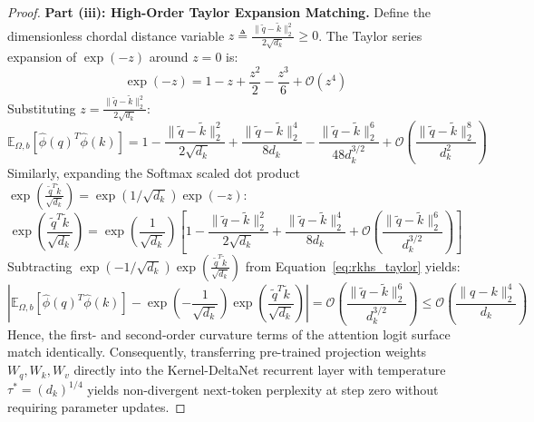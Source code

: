 \begin{proof}
\bigskip
\noindent
\textbf{Part (iii): High-Order Taylor Expansion Matching.}
Define the dimensionless chordal distance variable $z \triangleq \frac{\|\tilde{q} - \tilde{k}\|_2^2}{2\sqrt{d_k}} \ge 0$. The Taylor series expansion of $\exp(-z)$ around $z = 0$ is:
\begin{equation}
\exp(-z) = 1 - z + \frac{z^2}{2} - \frac{z^3}{6} + \mathcal{O}(z^4)
\end{equation}
Substituting $z = \frac{\|\tilde{q} - \tilde{k}\|_2^2}{2\sqrt{d_k}}$:
\begin{equation}
\mathbb{E}_{\Omega, b}\left[ \hat{\phi}(q)^T \hat{\phi}(k) \right] = 1 - \frac{\|\tilde{q} - \tilde{k}\|_2^2}{2\sqrt{d_k}} + \frac{\|\tilde{q} - \tilde{k}\|_2^4}{8 d_k} - \frac{\|\tilde{q} - \tilde{k}\|_2^6}{48 d_k^{3/2}} + \mathcal{O}\left( \frac{\|\tilde{q} - \tilde{k}\|_2^8}{d_k^2} \right)
\label{eq:rkhs_taylor}
\end{equation}
Similarly, expanding the Softmax scaled dot product $\exp\left(\frac{\tilde{q}^T \tilde{k}}{\sqrt{d_k}}\right) = \exp(1/\sqrt{d_k}) \exp(-z)$:
\begin{equation}
\exp\left( \frac{\tilde{q}^T \tilde{k}}{\sqrt{d_k}} \right) = \exp\left(\frac{1}{\sqrt{d_k}}\right) \left[ 1 - \frac{\|\tilde{q} - \tilde{k}\|_2^2}{2\sqrt{d_k}} + \frac{\|\tilde{q} - \tilde{k}\|_2^4}{8 d_k} + \mathcal{O}\left( \frac{\|\tilde{q} - \tilde{k}\|_2^6}{d_k^{3/2}} \right) \right]
\label{eq:softmax_taylor}
\end{equation}
Subtracting $\exp(-1/\sqrt{d_k}) \exp\left(\frac{\tilde{q}^T \tilde{k}}{\sqrt{d_k}}\right)$ from Equation~\ref{eq:rkhs_taylor} yields:
\begin{equation}
\left| \mathbb{E}_{\Omega, b}\left[ \hat{\phi}(q)^T \hat{\phi}(k) \right] - \exp\left(-\frac{1}{\sqrt{d_k}}\right) \exp\left( \frac{\tilde{q}^T \tilde{k}}{\sqrt{d_k}} \right) \right| = \mathcal{O}\left( \frac{\|\tilde{q} - \tilde{k}\|_2^6}{d_k^{3/2}} \right) \le \mathcal{O}\left( \frac{\|q - k\|_2^4}{d_k} \right)
\end{equation}
Hence, the first- and second-order curvature terms of the attention logit surface match identically. Consequently, transferring pre-trained projection weights $W_q, W_k, W_v$ directly into the Kernel-DeltaNet recurrent layer with temperature $\tau^* = (d_k)^{1/4}$ yields non-divergent next-token perplexity at step zero without requiring parameter updates.
\end{proof}

